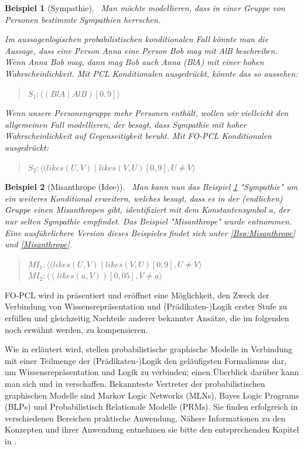 \documentclass[a4paper, 11pt]{book}
\newtheorem{Bsp}{Beispiel}[section]
\begin{document}
\begin{Bsp}[Sympathie]\label{sec:BspSmp}\
Man möchte modellieren, dass in einer Gruppe von Personen bestimmte Sympathien herrschen.

Im aussagenlogischen probabilistischen konditionalen Fall könnte man die Aussage, dass eine Person Anna eine Person Bob mag mit AlB beschreiben. Wenn Anna Bob mag, dann mag Bob auch Anna (BlA) mit einer hohen Wahrscheinlichkeit.
Mit PCL Konditionalen ausgedrückt, könnte das so aussehen:
\begin{quote}
$ S_{1} : \langle (BlA \mid AlB)[0,9]\rangle$\\
\end{quote}
Wenn unsere Personengruppe mehr Personen enthält, wollen wir vielleicht den allgemeinen Fall modellieren, der besagt, dass Sympathie mit hoher Wahrscheinlichkeit auf Gegenseitigkeit beruht.
Mit FO-PCL Konditionalen ausgedrückt:
\begin{quote}
	$ S_{2} : \langle (likes(U, V) \mid likes(V, U)[0,9], U \neq V \rangle$\\
\end{quote}

\end{Bsp}

\begin{Bsp}[Misanthrope (Idee)]\label{sec:Misanthrop}\
Man kann nun das Beispiel \ref{sec:BspSmp} "{}Sympathie"{} um ein weiteres Konditional erweitern, welches besagt, dass es in der (endlichen) Gruppe einen Misanthropen gibt, identifiziert mit dem Konstantensymbol a, der nur selten Sympathie empfindet. Das Beispiel "{}Misanthrope"{} wurde \cite[Bsp. 6.5.3, S. 144]{Fis10} entnommen. Eine ausführlichere Version dieses Beispieles findet sich unter \ref{Bsp:Misanthrope} und \ref{Misanthrope}.
\begin{quote}
$ MI_1 : \langle (likes(U, V) \mid likes(V, U)[0,9], U \neq V \rangle$\\
$ MI_2 : \langle (likes(a, V))[0,05], V \neq a \rangle$\\
\end{quote}


\end{Bsp}
FO-PCL wird in \cite[Kap. 6]{Fis10} präsentiert und eröffnet eine Möglichkeit, den Zweck der Verbindung von Wissensrepräsentation und (Prädikaten-)Logik erster Stufe zu erfüllen und gleichzeitig Nachteile anderer bekannter Ansätze, die im folgenden noch erwähnt werden, zu kompensieren.     

                            
Wie in \cite[S. 19]{Fis09} erläutert wird, stellen probabilistische graphische Modelle in Verbindung mit einer Teilmenge der (Prädikaten-)Logik den geläufigsten Formalismus dar, um Wissensrepräsentation und Logik zu verbinden; einen Überblick darüber kann man sich \cite{SBAR08} und in \cite[Kap. 10]{GT07} verschaffen. Bekannteste Vertreter der probabilistischen graphischen Modelle sind Markov Logic Networks (MLNs), Bayes Logic Programs (BLPs) und Probabilistisch Relationale Modelle (PRMs). Sie finden erfolgreich in verschiedenen Bereichen praktische Anwendung.
Nähere Informationen zu den Konzepten und ihrer Anwendung entnehmen sie bitte den entsprechenden Kapitel in \cite{GT07}.
\end{document}
